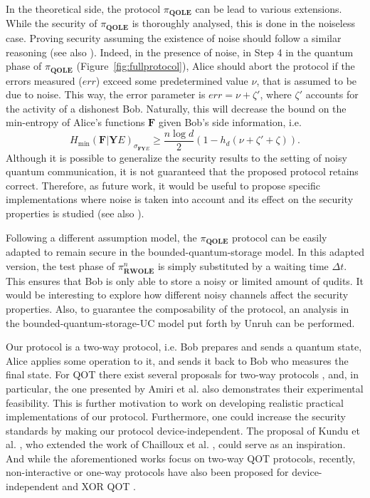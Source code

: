 In the theoretical side, the protocol $\pi_{\textbf{QOLE}}$ can be lead to various extensions. While the security of $\pi_{\textbf{QOLE}}$ is thoroughly analysed, this is done in the noiseless case. Proving security assuming the existence of noise should follow a similar reasoning (see also \cite{DFLSS09}). Indeed, in the presence of noise, in Step 4 in the quantum phase of $\pi_{\textbf{QOLE}}$ (Figure~\ref{fig:fullprotocol}), Alice should abort the protocol if the errors measured ($err$) exceed some predetermined value $\nu$, that is assumed to be due to noise. This way, the error parameter is $err = \nu + \zeta '$, where $\zeta '$ accounts for the activity of a dishonest Bob. Naturally, this will decrease the bound on the min-entropy of Alice's functions $\textbf{F}$ given Bob's side information, i.e.
$$H_{\min}(\mathbf{F} | \mathbf{Y} E)_{\sigma_{\mathbf{F}\mathbf{Y} E}} \geq \frac{n\log d}{2}\left(1 - h_d(\nu + \zeta ' + \zeta)\right).$$
Although it is possible to generalize the security results to the setting of noisy quantum communication, it is not guaranteed that the proposed protocol retains correct. Therefore, as future work, it would be useful to propose  specific implementations where noise is taken into account and its effect on the security properties is studied (see also \cite{BCDP21}).

Following a different assumption model, the $\pi_{\textbf{QOLE}}$ protocol can be easily adapted to remain secure in the bounded-quantum-storage model. In this adapted version, the test phase of $\pi^n_{\textbf{RWOLE}}$ is simply substituted by a waiting time $\Delta t$. This ensures that Bob is only able to store a noisy or limited amount of qudits. It would be interesting to explore how different noisy channels affect the security properties. Also, to guarantee the composability of the protocol, an analysis in the bounded-quantum-storage-UC model put forth by Unruh \cite{U11} can be performed.

Our protocol is a two-way protocol, i.e. Bob prepares and sends a quantum state, Alice applies some operation to it, and sends it back to Bob who measures the final state. For QOT there exist several proposals for two-way  protocols \cite{CZK18, ASRP21, KST21, CKS10, CGS16}, and, in particular, the one presented by Amiri et al. \cite{ASRP21} also demonstrates their experimental feasibility. This is further motivation to work on developing realistic practical implementations of our protocol. 
Furthermore, one could increase the security standards  by making our protocol device-independent. The proposal of Kundu et al. \cite{KST21}, who extended the work of Chailloux et al. \cite{CKS10}, could serve as an inspiration. And while the aforementioned works focus on two-way QOT protocols,  recently, non-interactive  or one-way protocols have also been proposed for device-independent \cite{BY21} and XOR QOT  \cite{SSH+21}.

